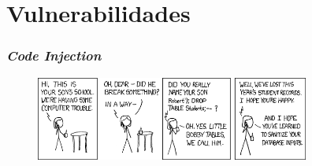 \section{Vulnerabilidades}

\begin{frame}
 \frametitle{\textit{Code Injection}}

 \begin{figure}
  \centering
  \includegraphics[width=9cm]{img/bob_tables}
 \end{figure}
\end{frame}

